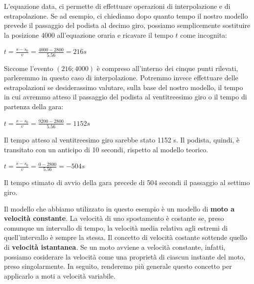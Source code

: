 L'equazione data, ci permette di effettuare operazioni di interpolazione e di estrapolazione. Se ad esempio, ci chiediamo dopo quanto tempo il nostro modello prevede il passaggio del podista al decimo giro, possiamo semplicemente sostituire la posizione 4000 all'equazione oraria e ricavare il tempo $t$ come incognita:
\begin{center}
\begin{math}
t = \frac {s -s_0} {v} = \frac {4000 - 2800} {5.56} = 216 s
\end{math}
\end{center}
Siccome l'evento $(216;4000)$ è compreso all'interno dei cinque punti rilevati, parleremmo in questo caso di interpolazione.\newline
Potremmo invece effettuare delle estrapolazioni se desiderassimo valutare, sulla base del nostro modello, il tempo in cui avremmo atteso il passaggio del podista al ventitreesimo giro o il tempo di partenza della gara:
\begin{center}
\begin{math}
t = \frac {s -s_0} {v} = \frac {9200 - 2800} {5.56} = 1152 s
\end{math}
\end{center}
Il tempo atteso al ventitreesimo giro sarebbe stato 1152 s. Il podista, quindi, è transitato con un anticipo di 10 secondi, rispetto al modello teorico.
\begin{center}
\begin{math}
t = \frac {s -s_0} {v} = \frac {0 - 2800} {5.56} = - 504 s
\end{math}
\end{center}
Il tempo stimato di avvio della gara precede di 504 secondi il passaggio al settimo giro.
\newline

Il modello  che abbiamo utilizzato in questo esempio è un modello di {\bf moto a velocità constante}.
La velocità di uno spostamento è costante se, preso comunque un intervallo di tempo, la velocità media relativa agli estremi di quell'intervallo è sempre la stessa.\newline
Il concetto di velocità costante sottende quello di {\bf velocità istantanea}. Se un moto avviene a velocità constante, infatti, possiamo cosiderare la velocità come una proprietà di ciascun instante del moto, preso singolarmente. In seguito, renderemo più generale questo concetto per applicarlo a moti a velocità variabile.
